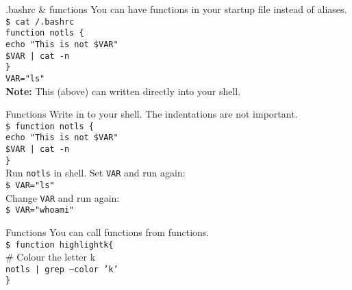 \documentclass{beamer}
\let\tt\texttt
\let\bf\textbf
\let\tilde\texttildelow
\begin{document}
\begin{frame}{.bashrc \& functions}
        You can have functions in your startup file instead of aliases. \\
        \tt{\$ cat {\tilde}/.bashrc}    \\
        \tt{function notls \{ }         \\
        \quad \tt{echo "This is not \$VAR"} \\
        \quad \tt{\$VAR | cat -n }      \\
        \tt{\} }                        \\
        \tt{VAR="ls"}                   \\
        \bf{Note:} This (above) can written directly into your shell. \\
\end{frame}

\begin{frame}{Functions}
        Write in to your shell. The indentations are not important. \\
        \tt{\$ function notls \{ }         \\
        \quad \tt{echo "This is not \$VAR"} \\
        \quad \tt{\$VAR | cat -n }      \\
        \tt{\} }                        \\
        Run \tt{notls} in shell. Set \tt{VAR} and run again: \\
        \tt{\$ VAR="ls"}                   \\
        Change \tt{VAR} and run again:     \\
        \tt{\$ VAR="whoami"}               \\
\end{frame}

\begin{frame}{Functions}
        You can call functions from functions.  \\
        \tt{\$ function highlightk\{ }        \\
        \quad \# Colour the letter k            \\
        \quad \tt{notls | grep --color 'k'}     \\
        \tt{\} }                        \\
\end{frame}
\end{document}
